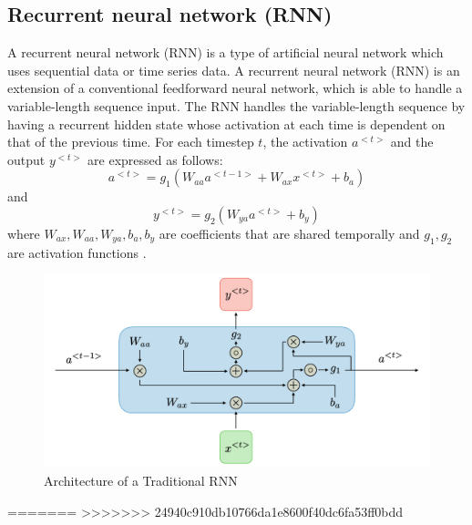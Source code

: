 \documentclass{ieeeojies}
\begin{document}
\subsection{Recurrent neural network (RNN)}
A recurrent neural network (RNN) is a type of artificial neural network which uses sequential data or time series data\cite{IBM}.  A recurrent neural network (RNN) is an extension of a conventional feedforward neural network, which is able to handle a variable-length sequence input. The RNN handles the variable-length sequence by having a recurrent hidden state whose activation at each time is dependent on that of the previous time\cite{Chung}.
For each timestep \( t \), the activation \( a^{<t>} \) and the output \( y^{<t>} \) are expressed as follows:
\[
a^{<t>} = g_1\left( W_{aa} a^{<t-1>} + W_{ax} x^{<t>} + b_a \right)
\]
and
\[
y^{<t>} = g_2\left( W_{ya} a^{<t>} + b_y \right)
\]
where \( W_{ax}, W_{aa}, W_{ya}, b_a, b_y \) are coefficients that are shared temporally and \( g_1, g_2 \) are activation functions \cite{standford}.

\begin{figure}[H]
    \centering
\begin{minipage}{0.5\textwidth}
        \centering
        \includegraphics[width=\textwidth]{bibliography/Figure/RNNmodel.png}
        \caption{Architecture of a Traditional RNN}
        \label{fig:3}
\end{minipage}
\end{figure}
=======
>>>>>>> 24940c910db10766da1e8600f40dc6fa53ff0bdd
\end{document}
